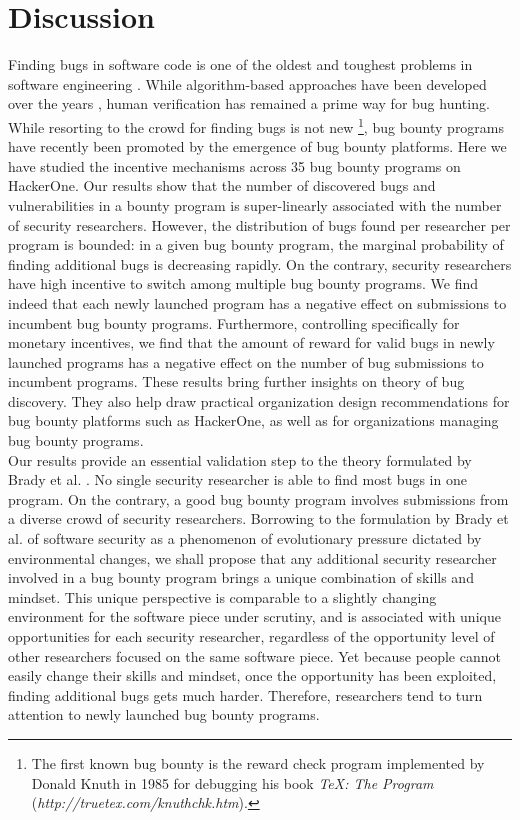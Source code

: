\section{Discussion}
\label{sec:discussion}
Finding bugs in software code is one of the oldest and toughest problems in software engineering \cite{adams1984textordfeminineoptimizing}. While algorithm-based approaches have been developed over the years \cite{avgerinos2014enhancing}, human verification has remained a prime way for bug hunting. While resorting to the crowd for finding bugs is not new \footnote{The first known bug bounty is the reward check program implemented by Donald Knuth in 1985 for debugging his book {\it TeX: The Program} ({\it http://truetex.com/knuthchk.htm}).}, bug bounty programs have recently been promoted by the emergence of bug bounty platforms. Here we have studied the incentive mechanisms across 35 bug bounty programs on HackerOne. Our results show that the number of discovered bugs and vulnerabilities in a bounty program is super-linearly associated with the number of security researchers. However, the distribution of bugs found per researcher per program is bounded: in a given bug bounty program, the marginal probability of finding additional bugs is decreasing rapidly. On the contrary, security researchers have high incentive to switch among multiple bug bounty programs. We find indeed that each newly launched program has a negative effect on submissions to incumbent bug bounty programs. Furthermore, controlling specifically for monetary incentives, we find that the amount of reward for valid bugs in newly launched programs has a negative effect on the number of bug submissions to incumbent programs. These results bring further insights on theory of bug discovery. They also help draw practical organization design recommendations for bug bounty platforms such as HackerOne, as well as for organizations managing bug bounty programs.\\
 
Our results provide an essential validation step to the theory formulated by Brady et al. \cite{brady1999murphy}. No single security researcher is able to find most bugs in one program. On the contrary, a good bug bounty program involves submissions from a diverse crowd of security researchers. Borrowing to the formulation by Brady et al. of software security as a phenomenon of evolutionary pressure dictated by environmental changes, we shall propose that any additional security researcher involved in a bug bounty program brings a unique combination of skills and mindset. This unique perspective is comparable to a slightly changing environment for the software piece under scrutiny, and is associated with unique opportunities for each security researcher, regardless of the opportunity level of other researchers focused on the same software piece. Yet because people cannot easily change their skills and mindset, once the opportunity has been exploited, finding additional bugs gets much harder. Therefore, researchers tend to turn attention to newly launched bug bounty programs.\\

